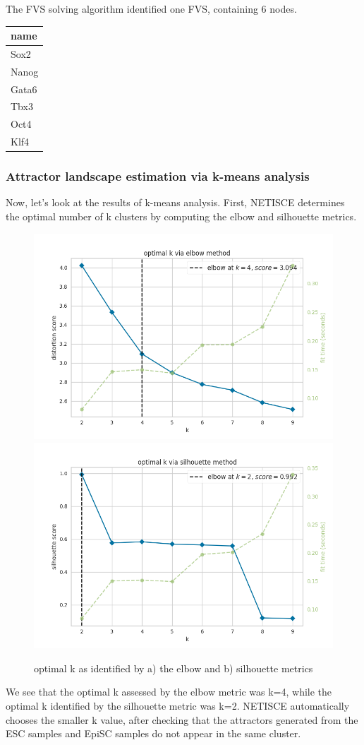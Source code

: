 \documentclass[
]{book}
\begin{document}
The FVS solving algorithm identified one FVS, containing 6 nodes.

\begin{tabular}{l}
\hline
name\\
\hline
Sox2\\
\hline
Nanog\\
\hline
Gata6\\
\hline
Tbx3\\
\hline
Oct4\\
\hline
Klf4\\
\hline
\end{tabular}

\hypertarget{section-id}{%
\subsubsection*{Attractor landscape estimation via k-means analysis}\label{section-id}}

Now, let's look at the results of k-means analysis. First, NETISCE determines the optimal number of k clusters by computing the elbow and silhouette metrics.

\begin{figure}
\includegraphics[width=0.5\linewidth]{ipsc/results/elbow} \includegraphics[width=0.5\linewidth]{ipsc/results/silhouette} \caption{optimal k as identified by a) the elbow and b) silhouette metrics}\label{fig:unnamed-chunk-25}
\end{figure}

We see that the optimal k assessed by the elbow metric was k=4, while the optimal k identified by the silhouette metric was k=2. NETISCE automatically chooses the smaller k value, after checking that the attractors generated from the ESC samples and EpiSC samples do not appear in the same cluster.
\end{document}
